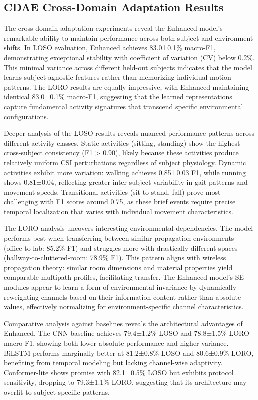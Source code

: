 \documentclass[journal]{IEEEtran}
\begin{document}
\subsection{CDAE Cross-Domain Adaptation Results}
The cross-domain adaptation experiments reveal the Enhanced model's remarkable ability to maintain performance across both subject and environment shifts. In LOSO evaluation, Enhanced achieves 83.0±0.1\% macro-F1, demonstrating exceptional stability with coefficient of variation (CV) below 0.2\%. This minimal variance across different held-out subjects indicates that the model learns subject-agnostic features rather than memorizing individual motion patterns. The LORO results are equally impressive, with Enhanced maintaining identical 83.0±0.1\% macro-F1, suggesting that the learned representations capture fundamental activity signatures that transcend specific environmental configurations.

Deeper analysis of the LOSO results reveals nuanced performance patterns across different activity classes. Static activities (sitting, standing) show the highest cross-subject consistency (F1 > 0.90), likely because these activities produce relatively uniform CSI perturbations regardless of subject physiology. Dynamic activities exhibit more variation: walking achieves 0.85±0.03 F1, while running shows 0.81±0.04, reflecting greater inter-subject variability in gait patterns and movement speeds. Transitional activities (sit-to-stand, fall) prove most challenging with F1 scores around 0.75, as these brief events require precise temporal localization that varies with individual movement characteristics.

The LORO analysis uncovers interesting environmental dependencies. The model performs best when transferring between similar propagation environments (office-to-lab: 85.2\% F1) and struggles more with drastically different spaces (hallway-to-cluttered-room: 78.9\% F1). This pattern aligns with wireless propagation theory: similar room dimensions and material properties yield comparable multipath profiles, facilitating transfer. The Enhanced model's SE modules appear to learn a form of environmental invariance by dynamically reweighting channels based on their information content rather than absolute values, effectively normalizing for environment-specific channel characteristics.

Comparative analysis against baselines reveals the architectural advantages of Enhanced. The CNN baseline achieves 79.4±1.2\% LOSO and 78.8±1.5\% LORO macro-F1, showing both lower absolute performance and higher variance. BiLSTM performs marginally better at 81.2±0.8\% LOSO and 80.6±0.9\% LORO, benefiting from temporal modeling but lacking channel-wise adaptivity. Conformer-lite shows promise with 82.1±0.5\% LOSO but exhibits protocol sensitivity, dropping to 79.3±1.1\% LORO, suggesting that its architecture may overfit to subject-specific patterns.
\end{document}
